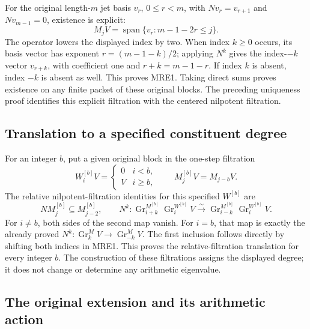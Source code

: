 For the original length-\(m\) jet basis \(v_r\), \(0\leq r<m\), with
\(Nv_r=v_{r+1}\) and \(Nv_{m-1}=0\), existence is explicit:
\[
 M_jV=\operatorname{span}\{v_r:m-1-2r\leq j\}.
 \tag{MRE4}
\]
The operator lowers the displayed index by two. When index \(k\geq0\)
occurs, its basis vector has exponent \(r=(m-1-k)/2\); applying \(N^k\)
gives the index-\(-k\) vector \(v_{r+k}\), with coefficient one and
\(r+k=m-1-r\). If index \(k\) is absent, index \(-k\) is absent as well.
This proves MRE1. Taking direct sums proves existence on any finite packet
of these original blocks. The preceding uniqueness proof identifies this
explicit filtration with the centered nilpotent filtration.

\subsection{Translation to a specified constituent degree}

For an integer \(b\), put a given original block in the one-step filtration
\[
 W_i^{[b]}V=
 \begin{cases}0&i<b,\\ V&i\geq b,\end{cases}
 \qquad
 M_j^{[b]}V=M_{j-b}V.
 \tag{MRE5}
\]
The relative nilpotent-filtration identities for this specified \(W^{[b]}\)
are
\[
 NM_j^{[b]}\subseteq M_{j-2}^{[b]},\qquad
 N^k:\operatorname{Gr}_{i+k}^{M^{[b]}}
             \operatorname{Gr}_i^{W^{[b]}}V
 \xrightarrow{\sim}
       \operatorname{Gr}_{i-k}^{M^{[b]}}
             \operatorname{Gr}_i^{W^{[b]}}V.
 \tag{MRE6}
\]
For \(i\ne b\), both sides of the second map vanish. For \(i=b\), that
map is exactly the already proved
\(N^k:\operatorname{Gr}_k^M V\to\operatorname{Gr}_{-k}^M V\).
The first inclusion follows directly by shifting both indices in MRE1.
This proves the relative-filtration translation for every integer \(b\).
The construction of these filtrations assigns the displayed degree; it
does not change or determine any arithmetic eigenvalue.

\subsection{The original extension and its arithmetic action}

